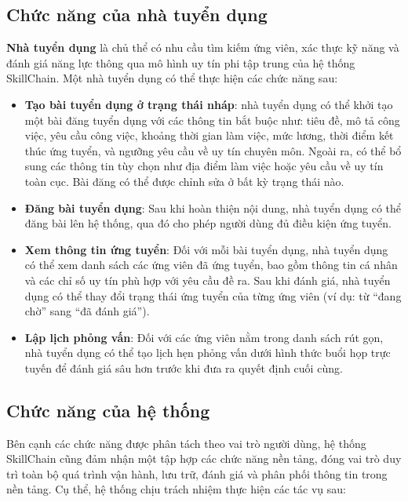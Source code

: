 \subsection{Chức năng của nhà tuyển dụng}

\textbf{Nhà tuyển dụng} là chủ thể có nhu cầu tìm kiếm ứng viên, xác thực kỹ năng và đánh giá năng lực thông qua mô hình uy tín phi tập trung của hệ thống SkillChain.
Một nhà tuyển dụng có thể thực hiện các chức năng sau:

\begin{itemize}
  \item \textbf{Tạo bài tuyển dụng ở trạng thái nháp}: nhà tuyển dụng có thể khởi tạo một bài đăng tuyển dụng với các thông tin bắt buộc như: tiêu đề, mô tả công việc, yêu cầu công việc, khoảng thời gian làm việc, mức lương, thời điểm kết thúc ứng tuyển, và ngưỡng yêu cầu về uy tín chuyên môn.
        Ngoài ra, có thể bổ sung các thông tin tùy chọn như địa điểm làm việc hoặc yêu cầu về uy tín toàn cục. Bài đăng có thể được chỉnh sửa ở bất kỳ trạng thái nào.
  \item \textbf{Đăng bài tuyển dụng}: Sau khi hoàn thiện nội dung, nhà tuyển dụng có thể đăng bài lên hệ thống, qua đó cho phép người dùng đủ điều kiện ứng tuyển.
  \item \textbf{Xem thông tin ứng tuyển}: Đối với mỗi bài tuyển dụng, nhà tuyển dụng có thể xem danh sách các ứng viên đã ứng tuyển, bao gồm thông tin cá nhân và các chỉ số uy tín phù hợp với yêu cầu đề ra.
        Sau khi đánh giá, nhà tuyển dụng có thể thay đổi trạng thái ứng tuyển của từng ứng viên (ví dụ: từ ``đang chờ'' sang ``đã đánh giá'').
  \item \textbf{Lập lịch phỏng vấn}: Đối với các ứng viên nằm trong danh sách rút gọn, nhà tuyển dụng có thể tạo lịch hẹn phỏng vấn dưới hình thức buổi họp trực tuyến để đánh giá sâu hơn trước khi đưa ra quyết định cuối cùng.
\end{itemize}

\subsection{Chức năng của hệ thống}

Bên cạnh các chức năng được phân tách theo vai trò người dùng, hệ thống SkillChain cũng đảm nhận một tập hợp các chức năng nền tảng, đóng vai trò duy trì toàn bộ quá trình vận hành, lưu trữ, đánh giá và phân phối thông tin trong nền tảng. Cụ thể, hệ thống chịu trách nhiệm thực hiện các tác vụ sau:

